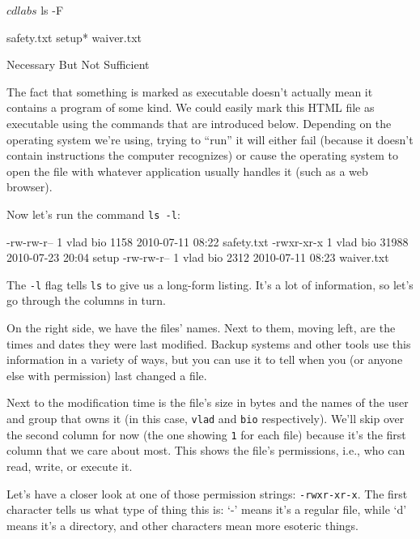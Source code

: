 \documentclass{book}
\begin{document}
\begin{VerbIn}
$ cd labs
$ ls -F
\end{VerbIn}

\begin{VerbOut}
safety.txt    setup*     waiver.txt
\end{VerbOut}

\begin{swcbox}{Necessary But Not Sufficient}

The fact that something is marked as executable doesn't actually mean it
contains a program of some kind. We could easily mark this HTML file as
executable using the commands that are introduced below. Depending on
the operating system we're using, trying to ``run'' it will either fail
(because it doesn't contain instructions the computer recognizes) or
cause the operating system to open the file with whatever application
usually handles it (such as a web browser).

\end{swcbox}

Now let's run the command \texttt{ls -l}:


\begin{VerbOut}
-rw-rw-r-- 1 vlad bio  1158  2010-07-11 08:22 safety.txt
-rwxr-xr-x 1 vlad bio 31988  2010-07-23 20:04 setup
-rw-rw-r-- 1 vlad bio  2312  2010-07-11 08:23 waiver.txt
\end{VerbOut}

The \texttt{-l} flag tells \texttt{ls} to give us a long-form listing.
It's a lot of information, so let's go through the columns in turn.

On the right side, we have the files' names. Next to them, moving left,
are the times and dates they were last modified. Backup systems and
other tools use this information in a variety of ways, but you can use
it to tell when you (or anyone else with permission) last changed a
file.

Next to the modification time is the file's size in bytes and the names
of the user and group that owns it (in this case, \texttt{vlad} and
\texttt{bio} respectively). We'll skip over the second column for now
(the one showing \texttt{1} for each file) because it's the first column
that we care about most. This shows the file's permissions, i.e., who
can read, write, or execute it.

Let's have a closer look at one of those permission strings:
\texttt{-rwxr-xr-x}. The first character tells us what type of thing
this is: `-' means it's a regular file, while `d' means it's a
directory, and other characters mean more esoteric things.
\end{document}
